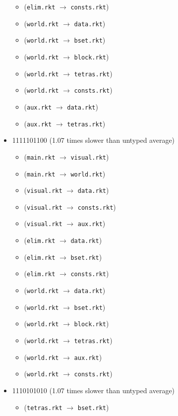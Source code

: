 \documentclass{article}
\newcommand{\mono}[1]{\texttt{#1}}
\begin{document}
\begin{itemize}
\begin{itemize}
  \item (\mono{elim.rkt} $\rightarrow$ \mono{consts.rkt})
  \item (\mono{world.rkt} $\rightarrow$ \mono{data.rkt})
  \item (\mono{world.rkt} $\rightarrow$ \mono{bset.rkt})
  \item (\mono{world.rkt} $\rightarrow$ \mono{block.rkt})
  \item (\mono{world.rkt} $\rightarrow$ \mono{tetras.rkt})
  \item (\mono{world.rkt} $\rightarrow$ \mono{consts.rkt})
  \item (\mono{aux.rkt} $\rightarrow$ \mono{data.rkt})
  \item (\mono{aux.rkt} $\rightarrow$ \mono{tetras.rkt})
  \end{itemize}
\item 1111101100 (1.07 times slower than untyped average)
  \begin{itemize}
  \item (\mono{main.rkt} $\rightarrow$ \mono{visual.rkt})
  \item (\mono{main.rkt} $\rightarrow$ \mono{world.rkt})
  \item (\mono{visual.rkt} $\rightarrow$ \mono{data.rkt})
  \item (\mono{visual.rkt} $\rightarrow$ \mono{consts.rkt})
  \item (\mono{visual.rkt} $\rightarrow$ \mono{aux.rkt})
  \item (\mono{elim.rkt} $\rightarrow$ \mono{data.rkt})
  \item (\mono{elim.rkt} $\rightarrow$ \mono{bset.rkt})
  \item (\mono{elim.rkt} $\rightarrow$ \mono{consts.rkt})
  \item (\mono{world.rkt} $\rightarrow$ \mono{data.rkt})
  \item (\mono{world.rkt} $\rightarrow$ \mono{bset.rkt})
  \item (\mono{world.rkt} $\rightarrow$ \mono{block.rkt})
  \item (\mono{world.rkt} $\rightarrow$ \mono{tetras.rkt})
  \item (\mono{world.rkt} $\rightarrow$ \mono{aux.rkt})
  \item (\mono{world.rkt} $\rightarrow$ \mono{consts.rkt})
  \end{itemize}
\item 1110101010 (1.07 times slower than untyped average)
  \begin{itemize}
  \item (\mono{tetras.rkt} $\rightarrow$ \mono{bset.rkt})

\end{itemize}
\end{itemize}
\end{document}
